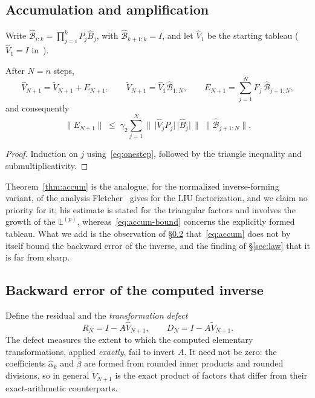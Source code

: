 \documentclass[review,onefignum,onetabnum]{siamart251216}
\begin{document}
\subsection{Accumulation and amplification}
\label{sec:accumulation}

Write $\widehat{\mathcal{B}}_{i:k} = \prod_{j=i}^{k}P_j\widehat B_j$, with
$\widehat{\mathcal{B}}_{k+1:k}=I$, and let $\widehat V_1$ be the starting tableau
($\widehat V_1=I$ in~\cite{CastilloCJPC2000}).

\begin{theorem}[Accumulation]\label{thm:accum}
After $N=n$ steps,
%
\begin{equation}\label{eq:accum}
\widehat V_{N+1}
=
\widetilde V_{N+1} + E_{N+1},
\qquad
\widetilde V_{N+1} = \widehat V_1\widehat{\mathcal{B}}_{1:N},
\qquad
E_{N+1} = \sum_{j=1}^{N} F_j\,\widehat{\mathcal{B}}_{j+1:N},
\end{equation}
%
and consequently
%
\begin{equation}\label{eq:accum-bound}
\bigl\|E_{N+1}\bigr\|
\;\le\;
\gamma_2 \sum_{j=1}^{N}
\bigl\|\,\bigl|\widehat V_jP_j\bigr|\,\bigl|\widehat B_j\bigr|\,\bigr\|
\;\bigl\|\widehat{\mathcal{B}}_{j+1:N}\bigr\| .
\end{equation}
\end{theorem}

\begin{proof}
Induction on $j$ using~\eqref{eq:onestep}, followed by the triangle inequality and
submultiplicativity.
\end{proof}

Theorem~\ref{thm:accum} is the analogue, for the normalized inverse-forming variant, of the
analysis Fletcher~\cite[Thm.~1]{Fletcher1997} gives for the LIU factorization, and we claim no
priority for it; his estimate is stated for the triangular factors and involves the growth of
the $\mathbb{L}^{(p)}$, whereas~\eqref{eq:accum-bound} concerns the explicitly formed tableau.
What we add is the observation of \S\ref{sec:defect} that~\eqref{eq:accum} does not by itself
bound the backward error of the inverse, and the finding of \S\ref{sec:law} that it is far from
sharp.

\subsection{Backward error of the computed inverse}
\label{sec:defect}

Define the residual and the \emph{transformation defect}
%
\begin{equation}\label{eq:defect}
R_N = I - A\widehat V_{N+1},
\qquad
D_N = I - A\widetilde V_{N+1} .
\end{equation}
%
The defect measures the extent to which the computed elementary transformations, applied
\emph{exactly}, fail to invert $A$. It need not be zero: the coefficients $\hat\alpha_k$ and
$\hat\beta$ are formed from rounded inner products and rounded divisions, so in general
$\widetilde V_{N+1}$ is the exact product of factors that differ from their exact-arithmetic
counterparts.
\end{document}

